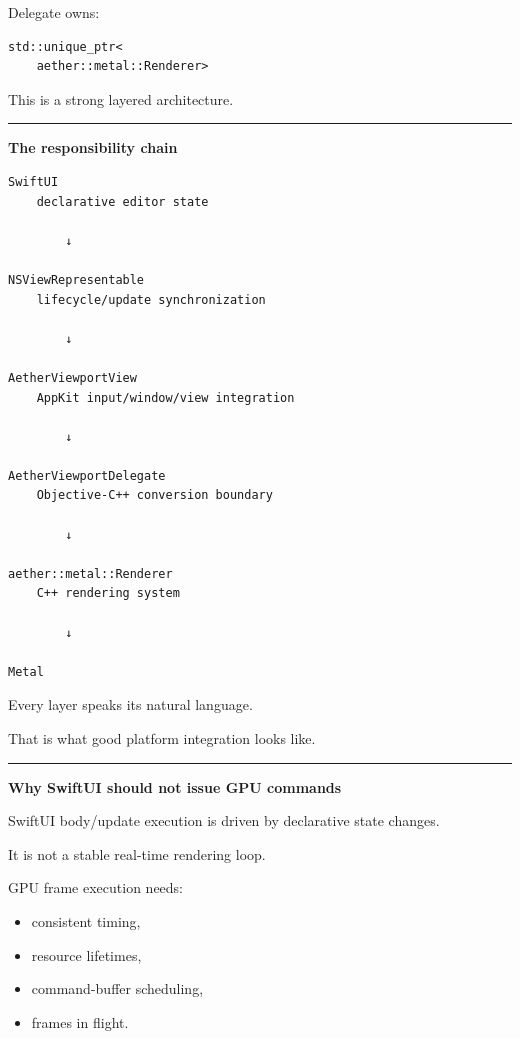 Delegate owns:

\begin{verbatim}
std::unique_ptr<
    aether::metal::Renderer>
\end{verbatim}

This is a strong layered architecture.

\begin{center}\rule{0.5\linewidth}{0.5pt}\end{center}

\textbf{The responsibility chain}

\begin{verbatim}
SwiftUI
    declarative editor state

        ↓

NSViewRepresentable
    lifecycle/update synchronization

        ↓

AetherViewportView
    AppKit input/window/view integration

        ↓

AetherViewportDelegate
    Objective-C++ conversion boundary

        ↓

aether::metal::Renderer
    C++ rendering system

        ↓

Metal
\end{verbatim}

Every layer speaks its natural language.

That is what good platform integration looks like.

\begin{center}\rule{0.5\linewidth}{0.5pt}\end{center}

\textbf{Why SwiftUI should not issue GPU commands}

SwiftUI body/update execution is driven by declarative state changes.

It is not a stable real-time rendering loop.

GPU frame execution needs:

\begin{itemize}
\tightlist
\item
  consistent timing,
\item
  resource lifetimes,
\item
  command-buffer scheduling,
\item
  frames in flight.
\end{itemize}

